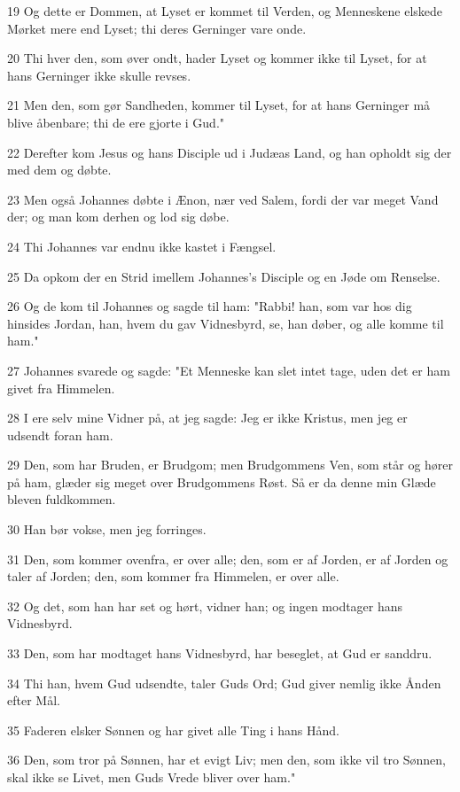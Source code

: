 \par 19 Og dette er Dommen, at Lyset er kommet til Verden, og Menneskene elskede Mørket mere end Lyset; thi deres Gerninger vare onde.
\par 20 Thi hver den, som øver ondt, hader Lyset og kommer ikke til Lyset, for at hans Gerninger ikke skulle revses.
\par 21 Men den, som gør Sandheden, kommer til Lyset, for at hans Gerninger må blive åbenbare; thi de ere gjorte i Gud."
\par 22 Derefter kom Jesus og hans Disciple ud i Judæas Land, og han opholdt sig der med dem og døbte.
\par 23 Men også Johannes døbte i Ænon, nær ved Salem, fordi der var meget Vand der; og man kom derhen og lod sig døbe.
\par 24 Thi Johannes var endnu ikke kastet i Fængsel.
\par 25 Da opkom der en Strid imellem Johannes's Disciple og en Jøde om Renselse.
\par 26 Og de kom til Johannes og sagde til ham: "Rabbi! han, som var hos dig hinsides Jordan, han, hvem du gav Vidnesbyrd, se, han døber, og alle komme til ham."
\par 27 Johannes svarede og sagde: "Et Menneske kan slet intet tage, uden det er ham givet fra Himmelen.
\par 28 I ere selv mine Vidner på, at jeg sagde: Jeg er ikke Kristus, men jeg er udsendt foran ham.
\par 29 Den, som har Bruden, er Brudgom; men Brudgommens Ven, som står og hører på ham, glæder sig meget over Brudgommens Røst. Så er da denne min Glæde bleven fuldkommen.
\par 30 Han bør vokse, men jeg forringes.
\par 31 Den, som kommer ovenfra, er over alle; den, som er af Jorden, er af Jorden og taler af Jorden; den, som kommer fra Himmelen, er over alle.
\par 32 Og det, som han har set og hørt, vidner han; og ingen modtager hans Vidnesbyrd.
\par 33 Den, som har modtaget hans Vidnesbyrd, har beseglet, at Gud er sanddru.
\par 34 Thi han, hvem Gud udsendte, taler Guds Ord; Gud giver nemlig ikke Ånden efter Mål.
\par 35 Faderen elsker Sønnen og har givet alle Ting i hans Hånd.
\par 36 Den, som tror på Sønnen, har et evigt Liv; men den, som ikke vil tro Sønnen, skal ikke se Livet, men Guds Vrede bliver over ham."

